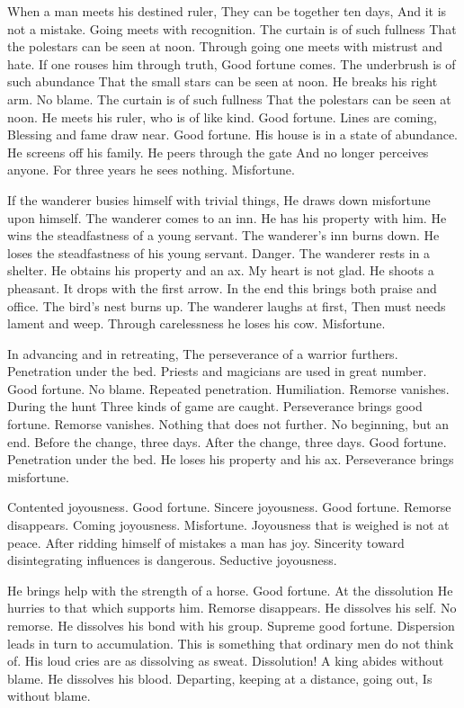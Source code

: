 {When a man meets his destined ruler,
 They can be together ten days,
 And it is not a mistake.
 Going meets with recognition.}
{The curtain is of such fullness
 That the polestars can be seen at noon.
 Through going one meets with mistrust and hate.
 If one rouses him through truth,
 Good fortune comes.}
{The underbrush is of such abundance
 That the small stars can be seen at noon.
 He breaks his right arm. No blame.}
{The curtain is of such fullness
 That the polestars can be seen at noon.
 He meets his ruler, who is of like kind.
 Good fortune.}
{Lines are coming,
 Blessing and fame draw near.
 Good fortune.}
{His house is in a state of abundance.
 He screens off his family.
 He peers through the gate
 And no longer perceives anyone.
 For three years he sees nothing.
 Misfortune.}

{If the wanderer busies himself with trivial things,
 He draws down misfortune upon himself.}
{The wanderer comes to an inn.
 He has his property with him.
 He wins the steadfastness of a young servant.}
{The wanderer’s inn burns down.
 He loses the steadfastness of his young servant.
 Danger.}
{The wanderer rests in a shelter.
 He obtains his property and an ax.
 My heart is not glad.}
{He shoots a pheasant.
 It drops with the first arrow.
 In the end this brings both praise and office.}
{The bird’s nest burns up.
 The wanderer laughs at first,
 Then must needs lament and weep.
 Through carelessness he loses his cow.
 Misfortune.}

{In advancing and in retreating,
 The perseverance of a warrior furthers.}
{Penetration under the bed.
 Priests and magicians are used in great number.
 Good fortune. No blame.}
{Repeated penetration. Humiliation.}
{Remorse vanishes.
 During the hunt
 Three kinds of game are caught.}
{Perseverance brings good fortune.
 Remorse vanishes.
 Nothing that does not further.
 No beginning, but an end.
 Before the change, three days.
 After the change, three days.
 Good fortune.}
{Penetration under the bed.
 He loses his property and his ax.
 Perseverance brings misfortune.}

{Contented joyousness. Good fortune.}
{Sincere joyousness. Good fortune.
 Remorse disappears.}
{Coming joyousness. Misfortune.}
{Joyousness that is weighed is not at peace.
 After ridding himself of mistakes a man has joy.}
{Sincerity toward disintegrating influences is dangerous.}
{Seductive joyousness.}

{He brings help with the strength of a horse.
 Good fortune.}
{At the dissolution
 He hurries to that which supports him.
 Remorse disappears.}
{He dissolves his self. No remorse.}
{He dissolves his bond with his group.
 Supreme good fortune.
 Dispersion leads in turn to accumulation.
 This is something that ordinary men do not think of.}
{His loud cries are as dissolving as sweat.
 Dissolution! A king abides without blame.}
{He dissolves his blood.
 Departing, keeping at a distance, going out,
 Is without blame.}

